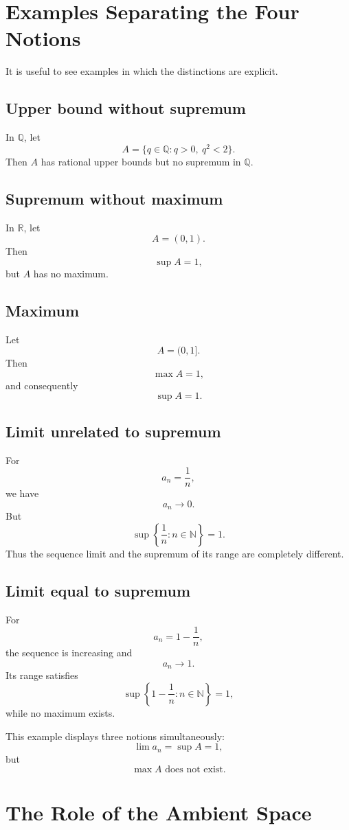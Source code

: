 \documentclass{essay}
\begin{document}
\section{Examples Separating the Four Notions}

It is useful to see examples in which the distinctions are explicit.

\subsection*{Upper bound without supremum}

In \(\mathbb{Q}\), let
\[ A=\{q\in\mathbb{Q}:q>0,\ q^{2}<2\}. \]
Then \(A\) has rational upper bounds but no supremum in \(\mathbb{Q}\).

\subsection*{Supremum without maximum}

In \(\mathbb{R}\), let
\[ A=(0,1). \]
Then
\[ \sup A=1, \]
but \(A\) has no maximum.

\subsection*{Maximum}

Let
\[ A=(0,1]. \]
Then
\[ \max A=1, \]
and consequently
\[ \sup A=1. \]

\subsection*{Limit unrelated to supremum}

For
\[ a_{n}=\frac{1}{n}, \]
we have
\[ a_{n}\to0. \]
But
\[ \sup\left\{\frac{1}{n}:n\in\mathbb{N}\right\}=1. \]
Thus the sequence limit and the supremum of its range are completely different.

\subsection*{Limit equal to supremum}

For
\[ a_{n}=1-\frac{1}{n}, \]
the sequence is increasing and
\[ a_{n}\to1. \]
Its range satisfies
\[ \sup\left\{1-\frac{1}{n}:n\in\mathbb{N}\right\}=1, \]
while no maximum exists.

This example displays three notions simultaneously:
\[ \lim a_{n}=\sup A=1, \]
but
\[ \max A\text{ does not exist}. \]

\section{The Role of the Ambient Space}
\end{document}
